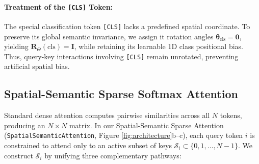 \documentclass[11pt,a4paper]{article}
\begin{document}
\paragraph{Treatment of the \texttt{[CLS]} Token:} The special classification token \texttt{[CLS]} lacks a predefined spatial coordinate. To preserve its global semantic invariance, we assign it rotation angles $\boldsymbol{\theta}_{\text{cls}} = \mathbf{0}$, yielding $\mathbf{R}_{\Theta}(\text{cls}) = \mathbf{I}$, while retaining its learnable 1D class positional bias. Thus, query-key interactions involving \texttt{[CLS]} remain unrotated, preventing artificial spatial bias.

\subsection{Spatial-Semantic Sparse Softmax Attention}
\label{subsec:sparse_attn}

Standard dense attention computes pairwise similarities across all $N$ tokens, producing an $N \times N$ matrix. In our Spatial-Semantic Sparse Attention (\texttt{SpatialSemanticAttention}, Figure \ref{fig:architecture}b--c), each query token $i$ is constrained to attend only to an active subset of keys $\mathcal{S}_i \subset \{0, 1, \dots, N-1\}$. We construct $\mathcal{S}_i$ by unifying three complementary pathways:
\end{document}
